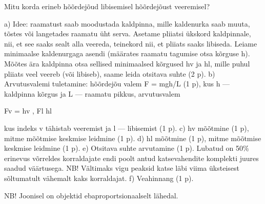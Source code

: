 
Mitu korda erineb hõõrdejõud libisemisel hõõrdejõust veeremisel?

\hint

\solu
a) Idee: raamatust saab moodustada kaldpinna, mille kaldenurka saab muuta, tõstes või langetades raamatu üht serva. Asetame pliiatsi ükskord kaldpinnale, nii, et see saaks sealt alla veereda, teinekord nii, et pliiats saaks libiseda. Leiame minimaalse kaldenurgaga asendi (määrates raamatu tagumise otsa kõrguse h). Mõõtes ära kaldpinna otsa sellised minimaalsed kõrgused hv ja hl, mille puhul pliiats veel veereb (või libiseb), saame leida otsitava suhte (2 p). b) Arvutusvalemi tuletamine: hõõrdejõu valem F = mgh/L (1 p), kus h --- kaldpinna kõrgus ja L --- raamatu pikkus, arvutusvalem

Fv = hv , Fl hl

kus indeks v tähistab veeremist ja l --- libisemist (1 p). c) hv mõõtmine (1 p), mitme mõõtmise keskmise leidmine (1 p). d) hl mõõtmine (1 p), mitme mõõtmise keskmise leidmine (1 p). e) Otsitava suhte arvutamine (1 p). Lubatud on 50\% erinevus võrreldes korraldajate endi poolt antud katsevahendite komplekti juures saadud väärtusega. NB! Vältimaks vigu peaksid katse läbi viima üksteisest sõltumatult vähemalt kaks korraldajat. f) Veahinnang (1 p).

NB! Joonisel on objektid ebaproportsionaalselt lähedal.
\probend
